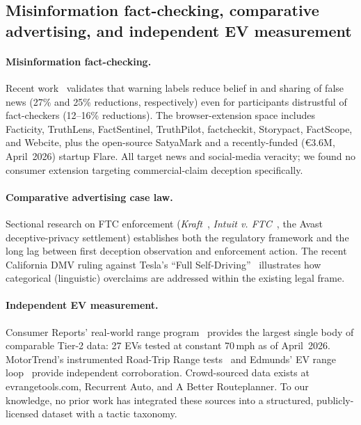 \documentclass{article}
\begin{document}
\subsection{Misinformation fact-checking, comparative advertising, and independent EV measurement}\label{sec:rw_other}

\paragraph{Misinformation fact-checking.} Recent work~\cite{nhb_warning_labels_2024} validates that warning labels reduce belief in and sharing of false news (27\% and 25\% reductions, respectively) even for participants distrustful of fact-checkers (12--16\% reductions). The browser-extension space includes Facticity, TruthLens, FactSentinel, TruthPilot, factcheckit, Storypact, FactScope, and Webcite, plus the open-source SatyaMark and a recently-funded (€3.6M, April~2026) startup Flare. All target news and social-media veracity; we found no consumer extension targeting commercial-claim deception specifically.

\paragraph{Comparative advertising case law.} Sectional research on FTC enforcement (\emph{Kraft}~\cite{ftc_kraft_1991}, \emph{Intuit v. FTC}~\cite{ftc_intuit_2026}, the Avast deceptive-privacy settlement) establishes both the regulatory framework and the long lag between first deception observation and enforcement action. The recent California DMV ruling against Tesla's ``Full Self-Driving''~\cite{techcrunch_fsd_ruling_2025} illustrates how categorical (linguistic) overclaims are addressed within the existing legal frame.

\paragraph{Independent EV measurement.} Consumer Reports' real-world range program~\cite{cr_ev_range_2023, cr_ev_methodology_2024} provides the largest single body of comparable Tier-2 data: 27 EVs tested at constant 70\,mph as of April~2026. MotorTrend's instrumented Road-Trip Range tests~\cite{mt_cybertruck_2024} and Edmunds' EV range loop~\cite{cd_eqs_2021} provide independent corroboration. Crowd-sourced data exists at evrangetools.com, Recurrent Auto, and A Better Routeplanner. To our knowledge, no prior work has integrated these sources into a structured, publicly-licensed dataset with a tactic taxonomy.
\end{document}
